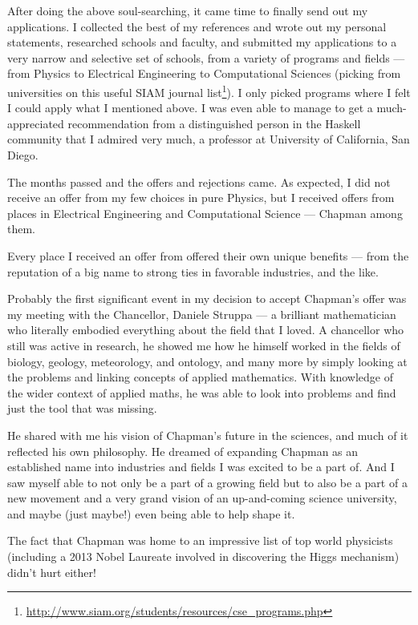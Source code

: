 \documentclass[]{article}
\renewcommand{\href}[2]{#2\footnote{\url{#1}}}
\begin{document}
After doing the above soul-searching, it came time to finally send out my
applications. I collected the best of my references and wrote out my personal
statements, researched schools and faculty, and submitted my applications to a
very narrow and selective set of schools, from a variety of programs and fields
--- from Physics to Electrical Engineering to Computational Sciences (picking
from universities on this
\href{http://www.siam.org/students/resources/cse_programs.php}{useful SIAM
journal list}). I only picked programs where I felt I could apply what I
mentioned above. I was even able to manage to get a much-appreciated
recommendation from a distinguished person in the Haskell community that I
admired very much, a professor at University of California, San Diego.

The months passed and the offers and rejections came. As expected, I did not
receive an offer from my few choices in pure Physics, but I received offers from
places in Electrical Engineering and Computational Science --- Chapman among
them.

Every place I received an offer from offered their own unique benefits --- from
the reputation of a big name to strong ties in favorable industries, and the
like.

Probably the first significant event in my decision to accept Chapman's offer
was my meeting with the Chancellor, Daniele Struppa --- a brilliant
mathematician who literally embodied everything about the field that I loved. A
chancellor who still was active in research, he showed me how he himself worked
in the fields of biology, geology, meteorology, and ontology, and many more by
simply looking at the problems and linking concepts of applied mathematics. With
knowledge of the wider context of applied maths, he was able to look into
problems and find just the tool that was missing.

He shared with me his vision of Chapman's future in the sciences, and much of it
reflected his own philosophy. He dreamed of expanding Chapman as an established
name into industries and fields I was excited to be a part of. And I saw myself
able to not only be a part of a growing field but to also be a part of a new
movement and a very grand vision of an up-and-coming science university, and
maybe (just maybe!) even being able to help shape it.

The fact that Chapman was home to an impressive list of top world physicists
(including a 2013 Nobel Laureate involved in discovering the Higgs mechanism)
didn't hurt either!
\end{document}
